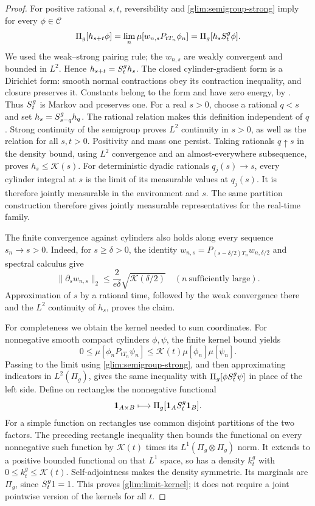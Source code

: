 \begin{proof}
For positive rational \(s,t\), reversibility and
\eqref{glim:semigroup-strong} imply for every \(\phi\in\mathscr C\)
\[
 \Pi_g[h_{s+t}\phi]
 =\lim_n\mu[w_{n,s}P_{tT_n}\phi_n]
 =\Pi_g[h_sS^g_t\phi].
\]
We used the weak--strong pairing rule; the \(w_{n,s}\) are weakly
convergent and bounded in \(L^2\).  Hence \(h_{s+t}=S^g_t h_s\).
The closed cylinder-gradient form is a Dirichlet form: smooth normal
contractions obey its contraction inequality, and closure preserves it.
Constants belong to the form and have zero energy, by
\cite[Proposition~5.1]{FUA}.  Thus \(S^g_t\) is Markov and preserves one.
For a real \(s>0\), choose a rational \(q<s\) and set
\(h_s=S^g_{s-q}h_q\).  The rational relation makes this definition
independent of \(q\).  Strong continuity of the semigroup proves
\(L^2\) continuity in \(s>0\), as well as the relation for all \(s,t>0\).
Positivity and mass one persist.  Taking rationals \(q\uparrow s\) in
the density bound, using \(L^2\) convergence and an almost-everywhere
subsequence, proves \(h_s\le \mathcal K(s)\).  For deterministic dyadic rationals
\(q_j(s)\to s\), every cylinder integral at \(s\) is the limit of its
measurable values at \(q_j(s)\).  It is therefore jointly measurable
in the environment and \(s\).  The same partition construction
therefore gives jointly measurable representatives for the real-time
family.

The finite convergence against cylinders also holds along every
sequence \(s_n\to s>0\).  Indeed, for \(s\ge\delta>0\), the identity
\(w_{n,s}=P_{(s-\delta/2)T_n}w_{n,\delta/2}\) and spectral calculus give
\begin{equation}
 \|\partial_s w_{n,s}\|_2
 \le \frac{2}{e\delta}\sqrt{\mathcal K(\delta/2)}
 \quad(n\ \text{sufficiently large}).
 \label{glim:time-equicontinuity}
\end{equation}
Approximation of \(s\) by a rational time, followed by the weak
convergence there and the \(L^2\) continuity of \(h_s\), proves the
claim.

For completeness we obtain the kernel needed to sum coordinates.
For nonnegative smooth compact cylinders \(\phi,\psi\), the finite kernel
bound yields
\[
 0\le\mu[\phi_nP_{tT_n}\psi_n]
       \le \mathcal K(t)\mu[\phi_n]\mu[\psi_n].
\]
Passing to the limit using \eqref{glim:semigroup-strong}, and then
approximating indicators in \(L^2(\Pi_g)\), gives the same inequality
with \(\Pi_g[\phi S^g_t\psi]\) in place of the left side.  Define on
rectangles the nonnegative functional
\[
 \mathbf 1_{A\times B}\longmapsto
       \Pi_g[\mathbf 1_AS^g_t\mathbf 1_B].
\]
For a simple function on rectangles use common disjoint partitions
of the two factors.  The preceding rectangle inequality then bounds
the functional on every nonnegative such function by \(\mathcal K(t)\) times
its \(L^1(\Pi_g\otimes\Pi_g)\) norm.  It extends to a positive bounded
functional on that \(L^1\) space, so has a density \(k_t^g\) with
\(0\le k_t^g\le \mathcal K(t)\).  Self-adjointness makes the density symmetric.
Its marginals are \(\Pi_g\), since \(S^g_t1=1\).  This proves
\eqref{glim:limit-kernel}; it does not require a joint pointwise version
of the kernels for all \(t\).


\end{proof}
